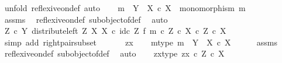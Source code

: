 \begin{isabellebody}
%
\isadelimproof
%
\endisadelimproof
%
\isatagproof
{}\isamarkupfalse%
\ {\isacharparenleft}{\kern0pt}unfold\ reflexive{\isacharunderscore}{\kern0pt}on{\isacharunderscore}{\kern0pt}def{\isacharcomma}{\kern0pt}\ auto{\isacharparenright}{\kern0pt}\isanewline
\ \ \isamarkupfalse%
\ {\isachardoublequoteopen}m\ {\isacharcolon}{\kern0pt}\ Y\ {\isasymrightarrow}\ X\ {\isasymtimes}\isactrlsub c\ X\ {\isasymand}\ monomorphism\ m{\isachardoublequoteclose}\isanewline
\ \ \ \ \isamarkupfalse%
\ assms\ \isamarkupfalse%
\ reflexive{\isacharunderscore}{\kern0pt}on{\isacharunderscore}{\kern0pt}def\ subobject{\isacharunderscore}{\kern0pt}of{\isacharunderscore}{\kern0pt}def{}\ \isamarkupfalse%
\ auto\isanewline
\ \ \isamarkupfalse%
\ \isamarkupfalse%
\ {\isachardoublequoteopen}{\isacharparenleft}{\kern0pt}Z\ {\isasymtimes}\isactrlsub c\ Y{\isacharcomma}{\kern0pt}\ distribute{\isacharunderscore}{\kern0pt}left\ Z\ X\ X\ {\isasymcirc}\isactrlsub c\ {\isacharparenleft}{\kern0pt}id\isactrlsub c\ Z\ {\isasymtimes}\isactrlsub f\ m{\isacharparenright}{\kern0pt}{\isacharparenright}{\kern0pt}\ {\isasymsubseteq}\isactrlsub c\ {\isacharparenleft}{\kern0pt}Z\ {\isasymtimes}\isactrlsub c\ X{\isacharparenright}{\kern0pt}\ {\isasymtimes}\isactrlsub c\ Z\ {\isasymtimes}\isactrlsub c\ X{\isachardoublequoteclose}\isanewline
\ \ \ \ \isamarkupfalse%
\ {\isacharparenleft}{\kern0pt}simp\ add{\isacharcolon}{\kern0pt}\ right{\isacharunderscore}{\kern0pt}pair{\isacharunderscore}{\kern0pt}subset{\isacharparenright}{\kern0pt}\isanewline
\ \ \isamarkupfalse%
\isanewline
\ \ \isamarkupfalse%
\ zx\isanewline
\ \ \isamarkupfalse%
\ m{\isacharunderscore}{\kern0pt}type{\isacharcolon}{\kern0pt}\ {\isachardoublequoteopen}m\ {\isacharcolon}{\kern0pt}\ Y\ {\isasymrightarrow}\ X\ {\isasymtimes}\isactrlsub c\ X{\isachardoublequoteclose}\isanewline
\ \ \ \ \isamarkupfalse%
\ assms\ \isamarkupfalse%
\ reflexive{\isacharunderscore}{\kern0pt}on{\isacharunderscore}{\kern0pt}def\ subobject{\isacharunderscore}{\kern0pt}of{\isacharunderscore}{\kern0pt}def{}\ \isamarkupfalse%
\ auto\isanewline
\ \ \isamarkupfalse%
\ zx{\isacharunderscore}{\kern0pt}type{\isacharcolon}{\kern0pt}\ {\isachardoublequoteopen}zx\ {\isasymin}\isactrlsub c\ Z\ {\isasymtimes}\isactrlsub c\ X{\isachardoublequoteclose}\isanewline
\ \ \isamarkupfalse%

\end{isabellebody}
